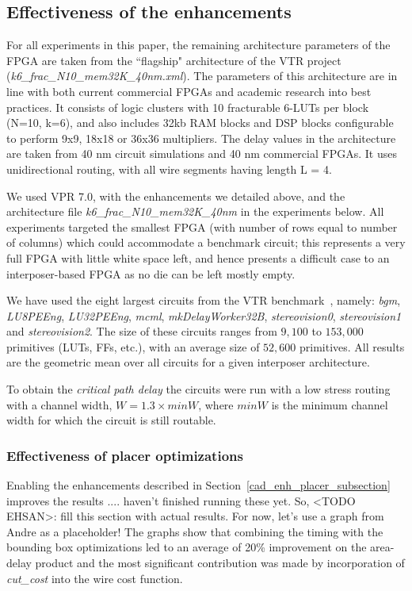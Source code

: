 \documentclass{sig-alternate-2013}
\begin{document}
\subsection{Effectiveness of the enhancements}
\label{sec:CADeffect}
For all experiments in this paper, the remaining architecture parameters of the FPGA are taken from the ``flagship" architecture of the VTR project (\textit{k6\_frac\_N10\_mem32K\_40nm.xml}). The parameters of this architecture are in line with both current commercial FPGAs and academic research into best practices. It consists of logic clusters with 10 fracturable 6-LUTs per block (N=10, k=6), and also includes 32kb RAM blocks and DSP blocks configurable to perform 9x9, 18x18 or 36x36 multipliers. The delay values in the architecture are taken from 40 nm circuit simulations and 40 nm commercial FPGAs. It uses unidirectional routing, with all wire segments having length L = 4.

We used VPR 7.0, with the enhancements we detailed above, and the architecture file \textit{k6\_frac\_N10\_mem32K\_40nm} in the experiments below. All experiments targeted the smallest FPGA (with number of rows equal to number of columns) which could accommodate a benchmark circuit; this represents a very full FPGA with little white space left, and hence presents a difficult case to an interposer-based FPGA as no die can be left mostly empty. 

We have used the eight largest circuits from the VTR benchmark~\cite{vtr2012}, namely: \textit{bgm}, \textit{LU8PEEng}, \textit{LU32PEEng}, \textit{mcml}, \textit{mkDelayWorker32B}, \textit{stereovision0}, \textit{stereovision1} and \textit{stereovision2}. The size of these circuits ranges from $9,100$ to $153,000$ primitives (LUTs, FFs, etc.), with an average size of $52,600$ primitives. All results are the geometric mean over all circuits for a given interposer architecture.

To obtain the \textit{critical path delay} the circuits were run with a low stress routing with a channel width, $W = 1.3 \times minW$, where $minW$ is the minimum channel width for which the circuit is still routable. 

\subsubsection{Effectiveness of placer optimizations}
\label{sec:effectiveness_of_placer_enhancements}
Enabling the enhancements described in Section~\ref{cad_enh_placer_subsection} improves the results .... haven't finished running these yet. So, <TODO EHSAN>: fill this section with actual results. For now, let's use a graph from Andre as a placeholder!
The graphs show that combining the timing with the bounding box optimizations led to an average of 20\% improvement on the area-delay product and the most significant contribution was made by incorporation of \textit{cut\_cost} into the wire cost function.
\end{document}
